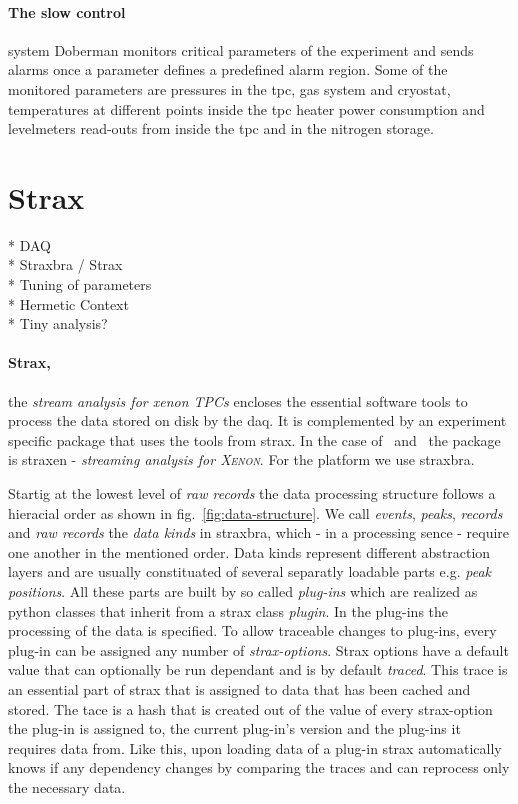 \paragraph{The slow control} system Doberman \cite{} monitors critical parameters of the experiment and sends alarms once a parameter defines a predefined alarm region.
Some of the monitored parameters are pressures in the \gls{tpc}, gas system and cryostat, temperatures at different points inside the \gls{tpc} heater power consumption and levelmeters read-outs from inside the \gls{tpc} and in the nitrogen storage.



\newpage
\FloatBarrier
\section{Strax}
\label{sec:Strax}
\FloatBarrier

* DAQ \\
* Straxbra / Strax \\
* Tuning of parameters \\
* Hermetic Context \\
* Tiny analysis?



\paragraph{Strax,} the \emph{stream analysis for xenon TPCs} encloses the essential software tools to process the data stored on disk by the \gls{daq}.  %
It is complemented by an experiment specific package that uses the tools from strax.
In the case of \oneton~and \nton~the package is straxen - \emph{streaming analysis for \textsc{Xenon}}.  %
For the \xebra platform we use straxbra.  %

Startig at the lowest level of \emph{raw records} the data processing structure follows a hieracial order as shown in fig.~\ref{fig:data-structure}.
We call \emph{events}, \emph{peaks}, \emph{records} and \emph{raw records} the \emph{data kinds} in straxbra, which - in a processing sence - require one another in the mentioned order.
Data kinds represent different abstraction layers and are usually constituated of several separatly loadable parts e.g. \emph{peak positions}.
All these parts are built by so called \emph{plug-ins} which are realized as python classes that inherit from a strax class \emph{plugin}.
In the plug-ins the processing of the data is specified.
To allow traceable changes to plug-ins, every plug-in can be assigned any number of \emph{strax-options}.
Strax options have a default value that can optionally be run dependant and is by default \emph{traced}.
This trace is an essential part of strax that is assigned to data that has been cached and stored.
The tace is a hash that is created out of the value of every strax-option the plug-in is assigned to, the current plug-in's version and the plug-ins it requires data from.
Like this, upon loading data of a plug-in strax automatically knows if any dependency changes by comparing the traces and can reprocess only the necessary data.


